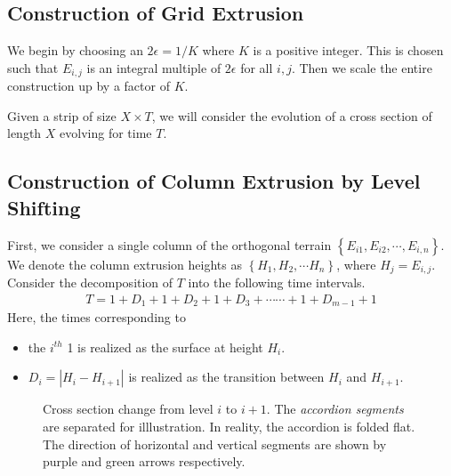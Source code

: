 \subsection{Construction of Grid Extrusion}
\label{sec:construction}

We begin by choosing an $2\epsilon=1/K$ where $K$ is a positive integer.
This is chosen such that $E_{i,j}$ is an integral multiple of $2\epsilon$ for all $i,j$.
Then we scale the entire construction up by a factor of $K$.

Given a strip of size $X\times T$, we will consider the evolution of a cross section of length $X$ evolving for time $T$.

\subsection{Construction of Column Extrusion by Level Shifting}
\label{sec:column_extrusion}

First, we consider a single column of the orthogonal terrain $\left\{ E_{i1}, E_{i2}, \cdots, E_{i,n} \right\}$.
We denote the column extrusion heights as $\left\{ H_1, H_2,\cdots H_n \right\}$, where $H_j = E_{i,j}$.
Consider the decomposition of $T$ into the following time intervals.%
\begin{align}
    \label{eq:column_decomposition}
T = 1 + D_1  +  1 + D_2  +  1 + D_3  +\cdots\cdots +  1 + D_{m-1}  +  1
\end{align}
Here, the times corresponding to
\begin{itemize}
\item the $i^{th}$ 1 is realized as the surface at height $H_i$.
\item $D_i = \left| H_i-H_{i+1}\right|$ is realized as the transition between $H_i$ and $H_{i+1}$.  \end{itemize}

\graphicspath{{./figures/}}
\begin{figure}[htb]
    \def\svgwidth{1.0\textwidth}
    \caption{
    Cross section change from level $i$ to $i+1$.
    The \emph{accordion segments} are separated for illlustration.
    In reality, the accordion is folded flat.
    The direction of horizontal and vertical segments are shown by purple and green arrows respectively.
    }
    \label{fig:level_shift_layers}
\end{figure}

